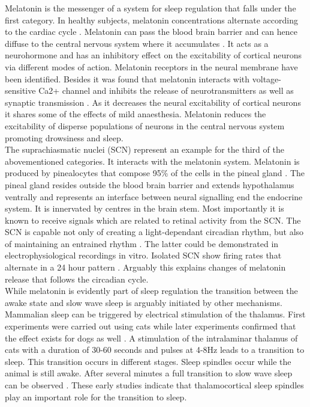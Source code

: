 Melatonin is the messenger of a system for sleep regulation that falls under the first category. In healthy subjects, melatonin concentrations alternate according to the cardiac cycle \parencite{montagna2005fatal}. Melatonin can pass the blood brain barrier and can hence diffuse to the central nervous system where it accumulates \parencite{aulinas2019physiology}. It acts as a neurohormone and has an inhibitory effect on the excitability of cortical neurons via different modes of action. Melatonin receptors in the neural membrane have been identified. Besides it was found that melatonin interacts with voltage-sensitive Ca2+ channel and inhibits the release of neurotransmitters as well as synaptic transmission \parencite{choi2014melatonin}. As it decreases the neural excitability of cortical neurons it shares some of the effects of mild anaesthesia. Melatonin reduces the excitability of disperse populations of neurons in the central nervous system promoting drowsiness and sleep. \\
The suprachiasmatic nuclei (SCN) represent an example for the third of the abovementioned categories. It interacts with the melatonin system. Melatonin is produced by pinealocytes that compose 95\% of the cells in the pineal gland \parencite{aulinas2019physiology}. The pineal gland resides outside the blood brain barrier and extends hypothalamus ventrally and represents an interface between neural signalling end the endocrine system. It is innervated by centres in the brain stem. Most importantly it is known to receive signals which are related to retinal activity from the SCN. The SCN is capable not only of creating a light-dependant circadian rhythm, but also of maintaining an entrained rhythm \parencite{koella1984organization}. The latter could be demonstrated in electrophysiological recordings in vitro. Isolated SCN show firing rates that alternate in a 24 hour pattern \parencite{de2011melatonergic}. Arguably this explains changes of melatonin release that follows the circadian cycle.\\
While melatonin is evidently part of sleep regulation the transition between the awake state and slow wave sleep is arguably initiated by other mechanisms. Mammalian sleep can be triggered by electrical stimulation of the thalamus. First experiments were carried out using cats while later experiments confirmed that the effect exists for dogs as well \parencite{akert1951sleep, akimoto1956sleep}. A stimulation of the intralaminar thalamus of cats with a duration of 30-60 seconds and pulses at 4-8Hz leads to a transition to sleep. This transition occurs in different stages. Sleep spindles occur while the animal is still awake. After several minutes a full transition to slow wave sleep can be observed \parencite{akert1951sleep}. These early studies indicate that thalamocortical sleep spindles play an important role for the transition to sleep.\\
